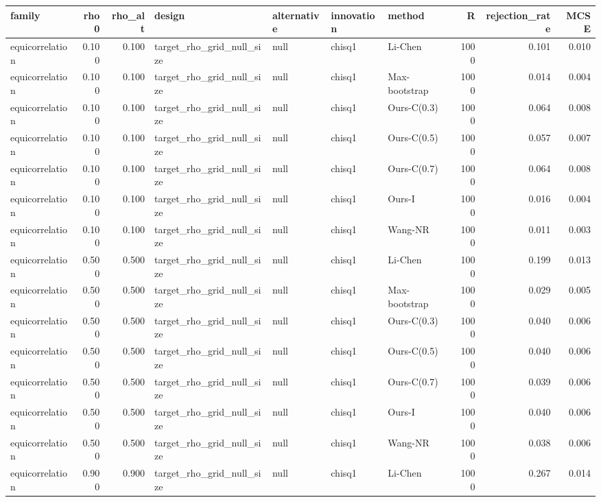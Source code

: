 \begin{tabular}{lrrllllrrr}
\toprule
family & rho0 & rho\_alt & design & alternative & innovation & method & R & rejection\_rate & MCSE \\
\midrule
equicorrelation & 0.100 & 0.100 & target\_rho\_grid\_null\_size & null & chisq1 & Li-Chen & 1000 & 0.101 & 0.010 \\
equicorrelation & 0.100 & 0.100 & target\_rho\_grid\_null\_size & null & chisq1 & Max-bootstrap & 1000 & 0.014 & 0.004 \\
equicorrelation & 0.100 & 0.100 & target\_rho\_grid\_null\_size & null & chisq1 & Ours-C(0.3) & 1000 & 0.064 & 0.008 \\
equicorrelation & 0.100 & 0.100 & target\_rho\_grid\_null\_size & null & chisq1 & Ours-C(0.5) & 1000 & 0.057 & 0.007 \\
equicorrelation & 0.100 & 0.100 & target\_rho\_grid\_null\_size & null & chisq1 & Ours-C(0.7) & 1000 & 0.064 & 0.008 \\
equicorrelation & 0.100 & 0.100 & target\_rho\_grid\_null\_size & null & chisq1 & Ours-I & 1000 & 0.016 & 0.004 \\
equicorrelation & 0.100 & 0.100 & target\_rho\_grid\_null\_size & null & chisq1 & Wang-NR & 1000 & 0.011 & 0.003 \\
equicorrelation & 0.500 & 0.500 & target\_rho\_grid\_null\_size & null & chisq1 & Li-Chen & 1000 & 0.199 & 0.013 \\
equicorrelation & 0.500 & 0.500 & target\_rho\_grid\_null\_size & null & chisq1 & Max-bootstrap & 1000 & 0.029 & 0.005 \\
equicorrelation & 0.500 & 0.500 & target\_rho\_grid\_null\_size & null & chisq1 & Ours-C(0.3) & 1000 & 0.040 & 0.006 \\
equicorrelation & 0.500 & 0.500 & target\_rho\_grid\_null\_size & null & chisq1 & Ours-C(0.5) & 1000 & 0.040 & 0.006 \\
equicorrelation & 0.500 & 0.500 & target\_rho\_grid\_null\_size & null & chisq1 & Ours-C(0.7) & 1000 & 0.039 & 0.006 \\
equicorrelation & 0.500 & 0.500 & target\_rho\_grid\_null\_size & null & chisq1 & Ours-I & 1000 & 0.040 & 0.006 \\
equicorrelation & 0.500 & 0.500 & target\_rho\_grid\_null\_size & null & chisq1 & Wang-NR & 1000 & 0.038 & 0.006 \\
equicorrelation & 0.900 & 0.900 & target\_rho\_grid\_null\_size & null & chisq1 & Li-Chen & 1000 & 0.267 & 0.014 \\

\end{tabular}
